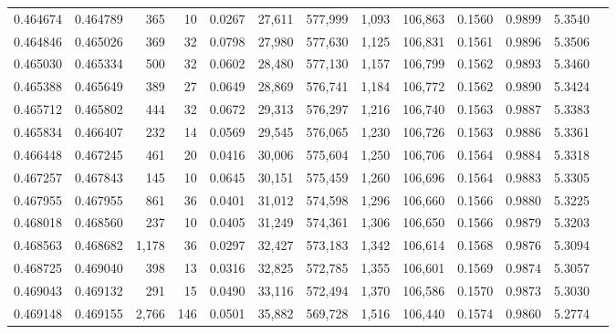 \begin{tabular}{rrrrrrrrrrrrr}
0.464674 & 0.464789 &   365 &    10 &                                     0.0267 &  27,611 & 577,999 &   1,093 & 106,863 & 0.1560 & 0.9899 & 5.3540 \\
0.464846 & 0.465026 &   369 &    32 &                                     0.0798 &  27,980 & 577,630 &   1,125 & 106,831 & 0.1561 & 0.9896 & 5.3506 \\
0.465030 & 0.465334 &   500 &    32 &                                     0.0602 &  28,480 & 577,130 &   1,157 & 106,799 & 0.1562 & 0.9893 & 5.3460 \\
0.465388 & 0.465649 &   389 &    27 &                                     0.0649 &  28,869 & 576,741 &   1,184 & 106,772 & 0.1562 & 0.9890 & 5.3424 \\
0.465712 & 0.465802 &   444 &    32 &                                     0.0672 &  29,313 & 576,297 &   1,216 & 106,740 & 0.1563 & 0.9887 & 5.3383 \\
0.465834 & 0.466407 &   232 &    14 &                                     0.0569 &  29,545 & 576,065 &   1,230 & 106,726 & 0.1563 & 0.9886 & 5.3361 \\
0.466448 & 0.467245 &   461 &    20 &                                     0.0416 &  30,006 & 575,604 &   1,250 & 106,706 & 0.1564 & 0.9884 & 5.3318 \\
0.467257 & 0.467843 &   145 &    10 &                                     0.0645 &  30,151 & 575,459 &   1,260 & 106,696 & 0.1564 & 0.9883 & 5.3305 \\
0.467955 & 0.467955 &   861 &    36 &                                     0.0401 &  31,012 & 574,598 &   1,296 & 106,660 & 0.1566 & 0.9880 & 5.3225 \\
0.468018 & 0.468560 &   237 &    10 &                                     0.0405 &  31,249 & 574,361 &   1,306 & 106,650 & 0.1566 & 0.9879 & 5.3203 \\
0.468563 & 0.468682 & 1,178 &    36 &                                     0.0297 &  32,427 & 573,183 &   1,342 & 106,614 & 0.1568 & 0.9876 & 5.3094 \\
0.468725 & 0.469040 &   398 &    13 &                                     0.0316 &  32,825 & 572,785 &   1,355 & 106,601 & 0.1569 & 0.9874 & 5.3057 \\
0.469043 & 0.469132 &   291 &    15 &                                     0.0490 &  33,116 & 572,494 &   1,370 & 106,586 & 0.1570 & 0.9873 & 5.3030 \\
0.469148 & 0.469155 & 2,766 &   146 &                                     0.0501 &  35,882 & 569,728 &   1,516 & 106,440 & 0.1574 & 0.9860 & 5.2774 \\

\end{tabular}
